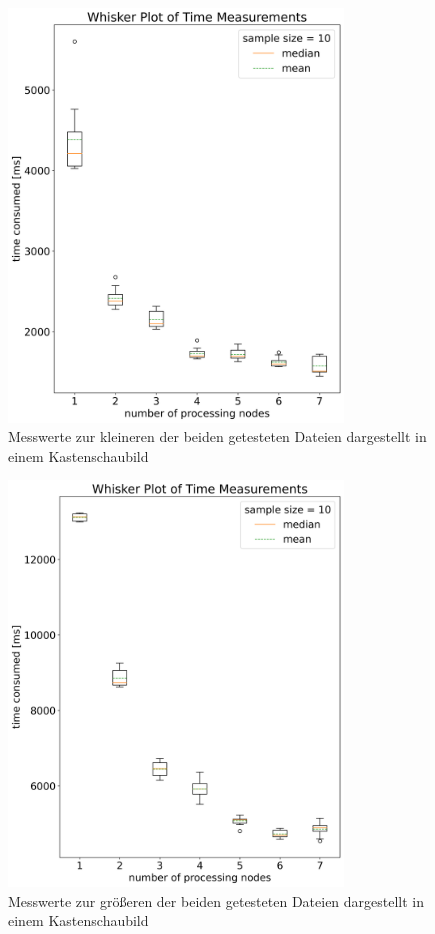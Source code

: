 \begin{figure}[!t]
	\centering
	\includegraphics[width=3.5in]{boxplots.png}
	\caption{Messwerte zur kleineren der beiden getesteten Dateien dargestellt in einem Kastenschaubild}
	\label{boxplot_times}
\end{figure}
\begin{figure}[!t]
	\centering
	\includegraphics[width=3.5in]{boxplots_long.png}
	\caption{Messwerte zur größeren der beiden getesteten Dateien dargestellt in einem Kastenschaubild}
	\label{boxplot_times_long}
\end{figure}